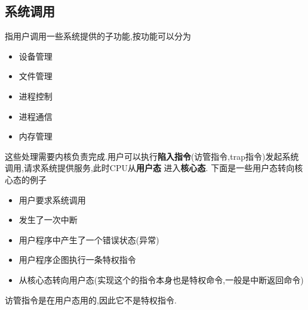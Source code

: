 \documentclass{ctexart}
\begin{document}
\subsection{系统调用}
指用户调用一些系统提供的子功能,按功能可以分为
\begin{itemize}
    \item 设备管理
    \item 文件管理
    \item 进程控制
    \item 进程通信
    \item 内存管理
\end{itemize}
这些处理需要内核负责完成.用户可以执行\textbf{陷入指令}(访管指令,trap指令)发起系统调用,请求系统提供服务,此时CPU从\textbf{用户态}
进入\textbf{核心态}.
下面是一些用户态转向核心态的例子
\begin{itemize}
    \item 用户要求系统调用
    \item 发生了一次中断
    \item 用户程序中产生了一个错误状态(异常)
    \item 用户程序企图执行一条特权指令
    \item 从核心态转向用户态(实现这个的指令本身也是特权命令,一般是中断返回命令)
\end{itemize}
访管指令是在用户态用的,因此它不是特权指令.
\end{document}
